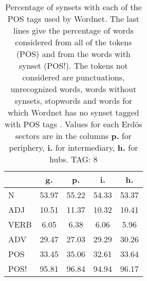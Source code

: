\begin{table}[h!]
\begin{center}
\begin{tabular}{| l | c | c | c | c |}\hline
 & g. & p. & i. & h. \\\hline
N & 53.97  & 55.22  & 54.33  & 53.37 \\\hline
ADJ & 10.51  & 11.37  & 10.32  & 10.41 \\\hline
VERB & 6.05  & 6.38  & 6.06  & 5.96 \\\hline
ADV & 29.47  & 27.03  & 29.29  & 30.26 \\\hline
POS & 33.45  & 35.06  & 32.61  & 33.64 \\\hline
POS! & 95.81  & 96.84  & 94.94  & 96.17 \\\hline
\end{tabular}
\caption{Percentage of synsets with each of the POS tags used by Wordnet. The last lines give the percentage of words considered from all of the tokens (POS) and from the words with synset (POS!). The tokens not considered are punctuations, unrecognized words, words without synsets, stopwords and words for which Wordnet has no synset  tagged with POS tags . Values for each Erd\"os sectors are in the columns {{\bf p.}} for periphery, {{\bf i.}} for intermediary, {{\bf h.}} for hubs. TAG: 8}
\end{center}
\end{table}
